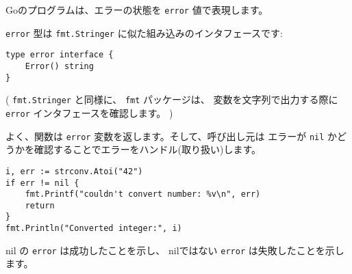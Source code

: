 Goのプログラムは、エラーの状態を \texttt{error} 値で表現します。

\texttt{error} 型は \texttt{fmt.Stringer} に似た組み込みのインタフェースです:

\begin{lstlisting}[numbers=none]
type error interface {
    Error() string
}
\end{lstlisting}

( \texttt{fmt.Stringer} と同様に、 \texttt{fmt} パッケージは、
変数を文字列で出力する際に \texttt{error} インタフェースを確認します。 )

よく、関数は \texttt{error} 変数を返します。そして、呼び出し元は
エラーが \texttt{nil} かどうかを確認することでエラーをハンドル(取り扱い)します。

\begin{lstlisting}[numbers=none]
i, err := strconv.Atoi("42")
if err != nil {
    fmt.Printf("couldn't convert number: %v\n", err)
    return
}
fmt.Println("Converted integer:", i)
\end{lstlisting}

nil の \texttt{error} は成功したことを示し、 nilではない \texttt{error} は失敗したことを示します。